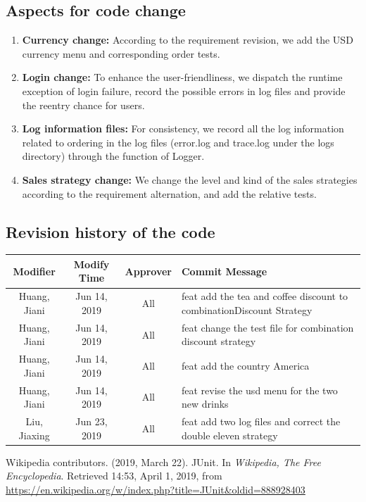 \documentclass[a4paper]{report}
\begin{document}
\subsection{Aspects for code change}
\begin{enumerate}
\item \textbf{Currency change: } According to the requirement revision, we add the USD currency menu and corresponding order tests.
\item \textbf{Login change: } To enhance the user-friendliness, we dispatch the runtime exception of login failure, record the possible errors in log files and provide the reentry chance for users.
\item \textbf{Log information files: } For consistency, we record all the log information related to ordering in the log files (error.log and trace.log under the logs directory) through the function of Logger.
\item \textbf{Sales strategy change: } We change the level and kind of the sales strategies according to the requirement alternation, and add the relative tests.
\end{enumerate}
\subsection{Revision history of the code}
\begin{tabular}{|c|c|c|l|}
\hline 
Modifier&Modify Time&Approver&Commit Message\\
\hline  
Huang, Jiani&Jun 14, 2019&All&feat add the tea and coffee discount to combinationDiscount Strategy\\
\hline
Huang, Jiani&Jun 14, 2019&All&feat change the test file for combination discount strategy\\
\hline
Huang, Jiani&Jun 14, 2019&All&feat add the country America\\
\hline
Huang, Jiani&Jun 14, 2019&All&feat revise the usd menu for the two new drinks\\
\hline
Liu, Jiaxing&Jun 23, 2019&All&feat add two log files and correct the double eleven strategy\\
\hline
\end{tabular}


\begin{thebibliography}{A}
Wikipedia contributors. (2019, March 22). JUnit. In \emph{Wikipedia, The Free Encyclopedia}. Retrieved 14:53, April 1, 2019, from \url{https://en.wikipedia.org/w/index.php?title=JUnit&oldid=888928403}
\end{thebibliography}
\end{document}
